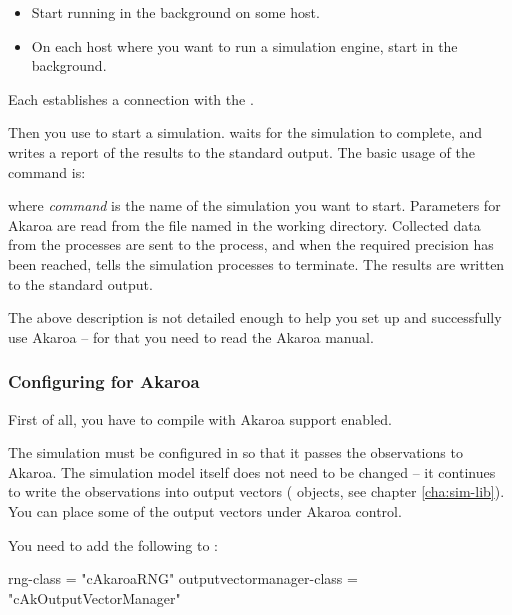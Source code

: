 \begin{itemize}
  \item{Start  running in the background on some host.}
  \item{On each host where you want to run a simulation engine,
     start  in the background.}
\end{itemize}

Each  establishes a connection with the .

Then you use  to start a simulation.  waits
for the simulation to complete, and writes a report of the results
to the standard output. The basic usage of the  command is:


where \textit{command} is the name of the simulation you want to start.
Parameters for Akaroa are read from the file named  in
the working directory. Collected data from the processes are
sent to the  process, and when the required precision
has been reached,  tells the simulation processes to
terminate. The results are written to the standard output.

The above description is not detailed enough to help you
set up and successfully use Akaroa -- for that you need to read the
Akaroa manual.

\subsubsection{Configuring {\opp} for Akaroa}
\label{sec:run-sim:configuring-akaroa}

First of all, you have to compile {\opp} with Akaroa support enabled.

The {\opp} simulation must be configured in 
so that it passes the observations to Akaroa. The simulation model itself does
not need to be changed -- it continues to write
the observations into output vectors ( objects,
see chapter \ref{cha:sim-lib}). You can place some of
the output vectors under Akaroa control.

You need to add the following to :

\begin{inifile}
[General]
rng-class = "cAkaroaRNG"
outputvectormanager-class = "cAkOutputVectorManager"
\end{inifile}

